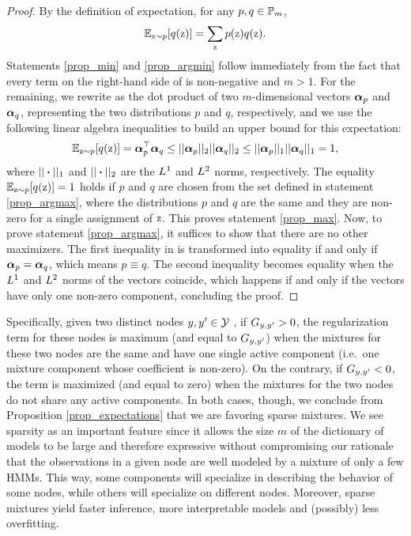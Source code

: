 \begin{proof}
    By the definition of expectation, for any $p, q \in {\mathbb{P}}_m$,
    \begin{equation}
        \label{prop_expdef}
        \mathbb{E}_{{\textnormal{z}}\sim p} [ q({\textnormal{z}}) ] = \sum_{{\textnormal{z}}} p({\textnormal{z}}) q({\textnormal{z}}).
    \end{equation}
    Statements \ref{prop_min} and \ref{prop_argmin} follow immediately from the fact that every term on the right-hand side of  is non-negative and $m>1$. For the remaining, we rewrite  as the dot product of two $m$-dimensional vectors ${\bm{\alpha}}_p$ and ${\bm{\alpha}}_q$, representing the two distributions $p$ and $q$, respectively, and we use the following linear algebra inequalities to build an upper bound for this expectation:
    \begin{equation}
        \label{prop_ineq}
        \mathbb{E}_{{\textnormal{z}}\sim p} [ q({\textnormal{z}}) ] = {\bm{\alpha}}_p ^\top {\bm{\alpha}}_q \leq || {\bm{\alpha}}_p ||_2 || {\bm{\alpha}}_q ||_2 \leq || {\bm{\alpha}}_p ||_1 || {\bm{\alpha}}_q ||_1 =1,
    \end{equation}
    where $||\boldsymbol{\cdot}||_1$ and $||\boldsymbol{\cdot}||_2$ are the $L^1$ and $L^2$ norms, respectively. The equality $\mathbb{E}_{{\textnormal{z}}\sim p} [ q({\textnormal{z}}) ] \allowbreak= 1$ holds if $p$ and $q$ are chosen from the set defined in statement \ref{prop_argmax}, where the distributions $p$ and $q$ are the same and they are non-zero for a single assignment of ${\textnormal{z}}$. This proves statement \ref{prop_max}. Now, to prove statement \ref{prop_argmax}, it suffices to show that there are no other maximizers. The first inequality in  is transformed into equality if and only if ${\bm{\alpha}}_p = {\bm{\alpha}}_q$, which means $p \equiv q$. The second inequality becomes equality when the $L^1$ and $L^2$ norms of the vectors coincide, which happens if and only if the vectors have only one non-zero component, concluding the proof.
\end{proof}
Specifically, given two distinct nodes $y, y' \in {\mathcal{Y}}$ , if ${G}_{y,y'} > 0$, the regularization term for these nodes is maximum (and equal to ${G}_{y,y'}$) when the mixtures for these two nodes are the same and have one single active component (i.e.\ one mixture component whose coefficient is non-zero). On the contrary, if ${G}_{y,y'} < 0$, the term is maximized (and equal to zero) when the mixtures for the two nodes do not share any active components. In both cases, though, we conclude from Proposition \ref{prop_expectations} that we are favoring sparse mixtures. We see sparsity as an important feature since it allows the size $m$ of the dictionary of models to be large and therefore expressive without compromising our rationale that the observations in a given node are well modeled by a mixture of only a few HMMs. This way, some components will specialize in describing the behavior of some nodes, while others will specialize on different nodes. Moreover, sparse mixtures yield faster inference, more interpretable models and (possibly) less overfitting.
